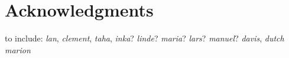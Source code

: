 \manualmark
{}%
%
%
\chapter*{Acknowledgments}%

to include: \emph{lan}, \emph{clement}, \emph{taha}, \emph{inka}? \emph{linde}? \emph{maria}? \emph{lars}? \emph{manuel}? \emph{davis}, \emph{dutch marion}\\
